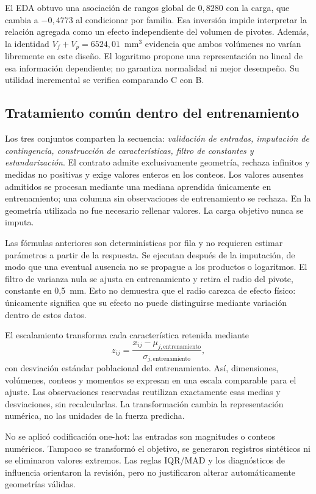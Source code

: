 El EDA obtuvo una asociación de rangos global de $0{,}8280$ con la carga, que cambia a $-0{,}4773$ al condicionar por familia. Esa inversión impide interpretar la relación agregada como un efecto independiente del volumen de pivotes. Además, la identidad $V_f+V_p=6524{,}01$~mm$^3$ evidencia que ambos volúmenes no varían libremente en este diseño. El logaritmo propone una representación no lineal de esa información dependiente; no garantiza normalidad ni mejor desempeño. Su utilidad incremental se verifica comparando C con B.

\subsection{Tratamiento común dentro del entrenamiento}
Los tres conjuntos comparten la secuencia: \emph{validación de entradas, imputación de contingencia, construcción de características, filtro de constantes y estandarización}. El contrato admite exclusivamente geometría, rechaza infinitos y medidas no positivas y exige valores enteros en los conteos. Los valores ausentes admitidos se procesan mediante una mediana aprendida únicamente en entrenamiento; una columna sin observaciones de entrenamiento se rechaza. En la geometría utilizada no fue necesario rellenar valores. La carga objetivo nunca se imputa.

Las fórmulas anteriores son determinísticas por fila y no requieren estimar parámetros a partir de la respuesta. Se ejecutan después de la imputación, de modo que una eventual ausencia no se propague a los productos o logaritmos. El filtro de varianza nula se ajusta en entrenamiento y retira el radio del pivote, constante en 0,5~mm. Esto no demuestra que el radio carezca de efecto físico: únicamente significa que su efecto no puede distinguirse mediante variación dentro de estos datos.

El escalamiento transforma cada característica retenida mediante
\begin{equation}
z_{ij}=\frac{x_{ij}-\mu_{j,\mathrm{entrenamiento}}}
{\sigma_{j,\mathrm{entrenamiento}}},
\label{eq:escalamiento}
\end{equation}
con desviación estándar poblacional del entrenamiento. Así, dimensiones, volúmenes, conteos y momentos se expresan en una escala comparable para el ajuste. Las observaciones reservadas reutilizan exactamente esas medias y desviaciones, sin recalcularlas. La transformación cambia la representación numérica, no las unidades de la fuerza predicha.

No se aplicó codificación one-hot: las entradas son magnitudes o conteos numéricos. Tampoco se transformó el objetivo, se generaron registros sintéticos ni se eliminaron valores extremos. Las reglas IQR/MAD y los diagnósticos de influencia orientaron la revisión, pero no justificaron alterar automáticamente geometrías válidas.

